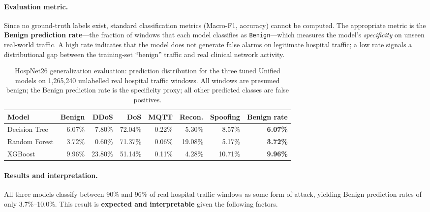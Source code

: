 \paragraph{Evaluation metric.}
Since no ground-truth labels exist, standard classification metrics (Macro-F1, accuracy) cannot be computed. The appropriate metric is the \textbf{Benign prediction rate}---the fraction of windows that each model classifies as \texttt{Benign}---which measures the model's \emph{specificity} on unseen real-world traffic. A high rate indicates that the model does not generate false alarms on legitimate hospital traffic; a low rate signals a distributional gap between the training-set ``benign'' traffic and real clinical network activity.

\begin{table}[H]
\centering
\caption{HospNet26 generalization evaluation: prediction distribution for the three tuned Unified models on 1,265,240 unlabelled real hospital traffic windows. All windows are presumed benign; the Benign prediction rate is the specificity proxy; all other predicted classes are false positives.}
\label{tab:hospnet26-eval}
\small
\begin{tabular}{@{}l r r r r r r | r@{}}
\toprule
\textbf{Model} & \textbf{Benign} & \textbf{DDoS} & \textbf{DoS} & \textbf{MQTT} & \textbf{Recon.} & \textbf{Spoofing} & \textbf{Benign rate} \\
\midrule
Decision Tree  & 6.07\% &  7.80\% & 72.04\% & 0.22\% &  5.30\% &  8.57\% & \textbf{6.07\%} \\
Random Forest  & 3.72\% &  0.60\% & 71.37\% & 0.06\% & 19.08\% &  5.17\% & \textbf{3.72\%} \\
XGBoost        & 9.96\% & 23.80\% & 51.14\% & 0.11\% &  4.28\% & 10.71\% & \textbf{9.96\%} \\
\bottomrule
\end{tabular}
\end{table}
\FloatBarrier

\paragraph{Results and interpretation.}
All three models classify between 90\% and 96\% of real hospital traffic windows as some form of attack, yielding Benign prediction rates of only 3.7\%--10.0\%. This result is \textbf{expected and interpretable} given the following factors.

